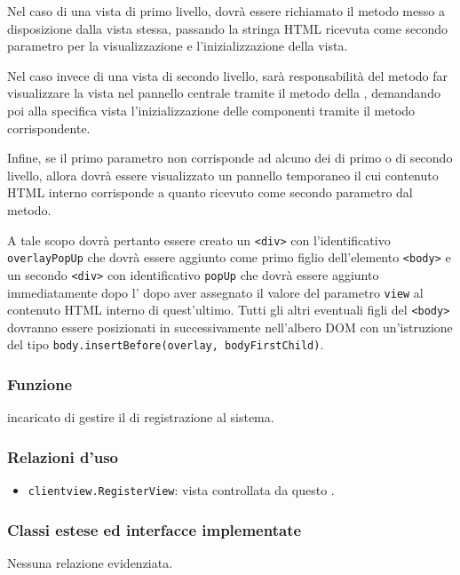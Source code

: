 \begin{description}
Nel caso di una vista di primo livello, dovrà essere richiamato il metodo  messo a disposizione dalla vista stessa, passando la stringa HTML ricevuta come secondo parametro per la visualizzazione e l'inizializzazione della vista.

Nel caso invece di una vista di secondo livello, sarà responsabilità del metodo far visualizzare la vista nel pannello centrale tramite il metodo  della , demandando poi alla specifica vista l'inizializzazione delle componenti tramite il metodo  corrispondente.

Infine, se il primo parametro non corrisponde ad alcuno dei  di primo o di secondo livello, allora dovrà essere visualizzato un pannello temporaneo il cui contenuto HTML interno corrisponde a quanto ricevuto come secondo parametro dal metodo.

A tale scopo dovrà pertanto essere creato un \verb'<div>' con l'identificativo \verb'overlayPopUp' che dovrà essere aggiunto come primo figlio dell'elemento \verb'<body>' e un secondo \verb'<div>' con identificativo \verb'popUp' che dovrà essere aggiunto immediatamente dopo l' dopo aver assegnato il valore del parametro \verb'view' al contenuto HTML interno di quest'ultimo. Tutti gli altri eventuali figli del \verb'<body>' dovranno essere posizionati in successivamente nell'albero DOM con un'istruzione del tipo \verb'body.insertBefore(overlay, bodyFirstChild)'.

\end{description}



\subsubsection*{Funzione}
 incaricato di gestire il  di registrazione al sistema.

\subsubsection*{Relazioni d'uso}
\begin{itemize}
  \item \texttt{clientview.RegisterView}: vista controllata da questo .
\end{itemize}

\subsubsection*{Classi estese ed interfacce implementate}
Nessuna relazione evidenziata.

